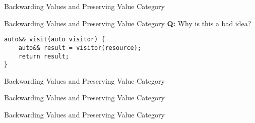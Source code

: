 \begin{frame}[fragile]{Backwarding Values and Preserving Value Category}
\end{frame}

\begin{frame}[fragile]{Backwarding Values and Preserving Value Category}
    \textbf{Q:} Why is this a bad idea?
    \begin{lstlisting}
auto&& visit(auto visitor) {
    auto&& result = visitor(resource);
    return result;
}
    \end{lstlisting}
    
\end{frame}

\begin{frame}[fragile]{Backwarding Values and Preserving Value Category}
\end{frame}

\begin{frame}[fragile]{Backwarding Values and Preserving Value Category}
\end{frame}

\begin{frame}[fragile]{Backwarding Values and Preserving Value Category}
    \centering
\end{frame}

